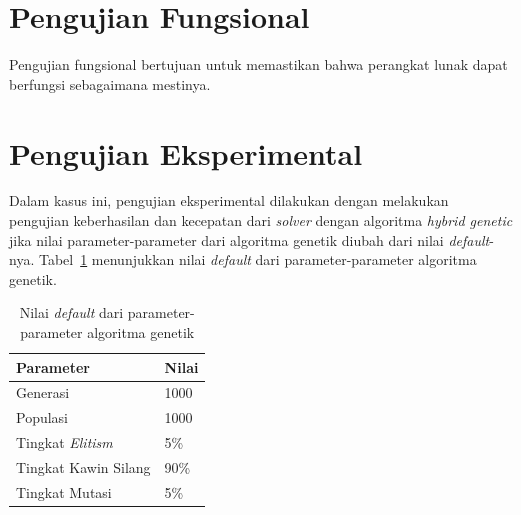 \section{Pengujian Fungsional}
\label{sec:pengujianfungsional}

Pengujian fungsional bertujuan untuk memastikan bahwa perangkat lunak dapat berfungsi sebagaimana mestinya.

\section{Pengujian Eksperimental}
\label{sec:pengujianeksperimental}

Dalam kasus ini, pengujian eksperimental dilakukan dengan melakukan pengujian keberhasilan dan kecepatan dari \textit{solver} dengan algoritma \textit{hybrid genetic} jika nilai parameter-parameter dari algoritma genetik diubah dari nilai \textit{default}-nya. Tabel~\ref{tab:nilaidefaultparameterga} menunjukkan nilai \textit{default} dari parameter-parameter algoritma genetik.

\begin{table}
\centering
\captionsetup{justification=centering}
\caption[Nilai \textit{default} dari parameter-parameter algoritma genetik]{Nilai \textit{default} dari parameter-parameter algoritma genetik}
\begin{tabular}{| l | l |}
\hline
Parameter & Nilai \\
\hline \hline
Generasi & 1000 \\
\hline
Populasi & 1000 \\
\hline
Tingkat \textit{Elitism} & 5\% \\
\hline
Tingkat Kawin Silang & 90\% \\
\hline
Tingkat Mutasi & 5\% \\
\hline
\end{tabular}
\label{tab:nilaidefaultparameterga}
\end{table}